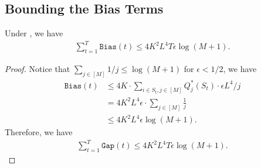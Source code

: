 \subsection{Bounding the Bias Terms}
\begin{lemma}\label{lemma:bias-t-bound}
Under , we have
\begin{align*}
    \sum_{t=1}^T \texttt{Bias}(t) \le 4K^2L^4 T\epsilon \log(M + 1).
\end{align*}
\begin{proof}
Notice that $\sum_{j\in[M]} 1/j \le \log(M+1)$ for $\epsilon < 1/2$, we have
\begin{align*}
    \texttt{Bias}(t) &\le 4K \cdot \sum_{i \in S_t,j \in [M]}Q^*_{j}(S_t) \cdot \epsilon L^4/j \\
    &= 4K^2L^4\epsilon \cdot \sum_{j \in [M]} \frac{1}{j} \\
    &\le 4K^2L^4 \epsilon\log(M + 1).
\end{align*}
Therefore, we have
\begin{align*}
    \sum_{t=1}^T \texttt{Gap}(t) \le 4K^2L^4 T\epsilon \log(M+1).
\end{align*}
\end{proof}
\end{lemma}



